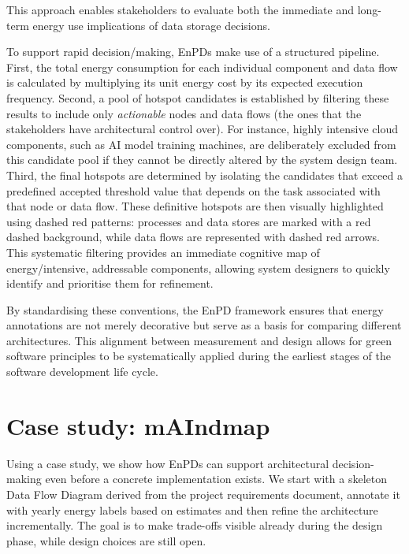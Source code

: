 \begin{description}
  This approach enables stakeholders to evaluate both the immediate and long-term energy use implications of data storage decisions.
  \item[Hotspot identification] To support rapid decision\-/making, EnPDs make use of a structured pipeline.
  First, the total energy consumption for each individual component and data flow is calculated by multiplying its unit energy cost by its expected execution frequency.
  Second, a pool of hotspot candidates is established by filtering these results to include only \emph{actionable} nodes and data flows (the ones that the stakeholders have architectural control over).
  For instance, highly intensive cloud components, such as AI model training machines, are deliberately excluded from this candidate pool if they cannot be directly altered by the system design team.
  Third, the final hotspots are determined by isolating the candidates that exceed a predefined accepted threshold value that depends on the task associated with that node or data flow.
  These definitive hotspots are then visually highlighted using dashed red patterns: processes and data stores are marked with a red dashed background, while data flows are represented with dashed red arrows.
  This systematic filtering provides an immediate cognitive map of energy\-/intensive, addressable components, allowing system designers to quickly identify and prioritise them for refinement.
\end{description}
By standardising these conventions, the EnPD framework ensures that energy annotations are not merely decorative but serve as a basis for comparing different architectures.
This alignment between measurement and design allows for green software principles to be systematically applied during the earliest stages of the software development life cycle.

\section{Case study: mAIndmap}
Using a case study, we show how EnPDs can support architectural decision-making even before a concrete implementation exists.
We start with a skeleton Data Flow Diagram derived from the project requirements document, annotate it with yearly energy labels based on estimates and then refine the architecture incrementally.
The goal is to make trade-offs visible already during the design phase, while design choices are still open.

